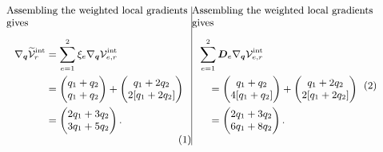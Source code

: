 \documentclass[a4paper,12pt]{article}
\newcommand{\vect}[1]{\boldsymbol{#1}}
\newcommand{\matr}[1]{\boldsymbol{#1}}
\begin{document}
\begin{subequations}
 \label{eq:appendix-structural-weighted-vectors}
 \noindent
 \begin{minipage}[t]{0.48\linewidth}
  \vspace{0pt}\small\raggedright
  Assembling the weighted local gradients gives
  \begin{equation}
   \begin{aligned}
    \nabla_{\vect{q}}\widetilde{\mathcal V}_r^{\mathrm{int}}
    &=\sum_{e=1}^{2}\xi_e\nabla_{\vect{q}}\mathcal V_{e,r}^{\mathrm{int}}\\
    &=\begin{pmatrix}q_1+q_2\\q_1+q_2\end{pmatrix}
     +\begin{pmatrix}q_1+2q_2\\2[q_1+2q_2]\end{pmatrix}\\
    &=\begin{pmatrix}2q_1+3q_2\\3q_1+5q_2\end{pmatrix}.
   \end{aligned}
   \label{eq:appendix-structural-classical-force}
  \end{equation}
 \end{minipage}\hfill\vrule width 0.4pt\hfill%
 \begin{minipage}[t]{0.48\linewidth}
  \vspace{0pt}\small\raggedright
  Assembling the weighted local gradients gives
  \begin{equation}
   \begin{aligned}
    &\sum_{e=1}^{2}\matr{D}_e\nabla_{\vect{q}}\mathcal V_{e,r}^{\mathrm{int}}\\
    &\quad=\begin{pmatrix}q_1+q_2\\4[q_1+q_2]\end{pmatrix}
     +\begin{pmatrix}q_1+2q_2\\2[q_1+2q_2]\end{pmatrix}\\
    &\quad=\begin{pmatrix}2q_1+3q_2\\6q_1+8q_2\end{pmatrix}.
   \end{aligned}
   \label{eq:appendix-structural-bm-assembly}
  \end{equation}
 \end{minipage}
\end{subequations}
\end{document}
